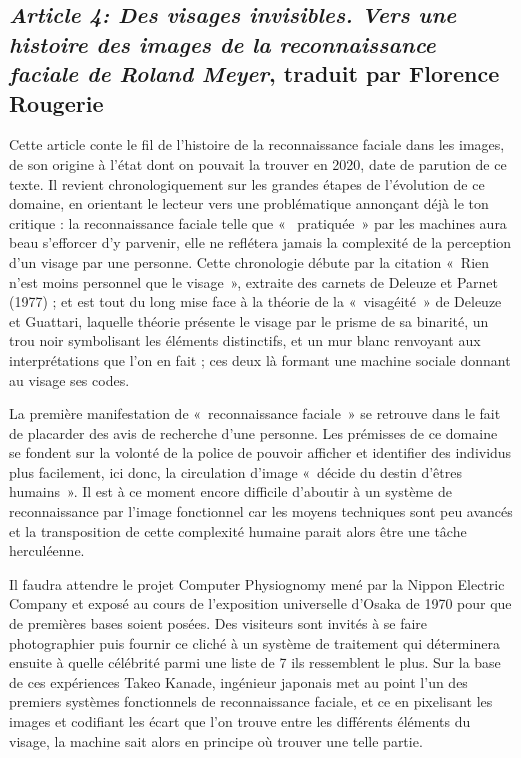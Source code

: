 \documentclass[11pt]{article}
\begin{document}
\subsection{\textit{Article 4: Des visages invisibles. Vers une histoire des images de la reconnaissance faciale de Roland 
Meyer}, traduit par Florence Rougerie}
Cette article conte le fil de l’histoire de la reconnaissance faciale dans les images, de son origine à l’état dont on pouvait 
la trouver en 2020, date de parution de ce texte. Il revient chronologiquement sur les grandes étapes de l’évolution de ce 
domaine, en orientant le lecteur vers une problématique annonçant déjà le ton critique : la reconnaissance faciale telle que « 
pratiquée » par les machines aura beau s’efforcer d’y parvenir, elle ne reflétera jamais la complexité de la perception d’un 
visage par une personne.
Cette chronologie débute par la citation « Rien n’est moins personnel que le visage », extraite des carnets de Deleuze et Parnet 
(1977) ; et est tout du long mise face à la théorie de la « visagéité » de Deleuze et Guattari, laquelle théorie présente le 
visage par le prisme de sa binarité, un trou noir symbolisant les éléments distinctifs, et un mur blanc renvoyant aux 
interprétations que l'on en fait ; ces deux là formant une machine sociale donnant au visage ses codes.

La première manifestation de « reconnaissance faciale » se retrouve dans le fait de placarder des avis de recherche d’une 
personne. Les prémisses de ce domaine se fondent sur la volonté de la police de pouvoir afficher et identifier des individus 
plus facilement, ici donc, la circulation d’image « décide du destin d’êtres humains ».
Il est à ce moment encore difficile d’aboutir à un système de reconnaissance par l’image fonctionnel car les moyens techniques 
sont peu avancés et la transposition de cette complexité humaine parait alors être une tâche herculéenne.

Il faudra attendre le projet Computer Physiognomy mené par la Nippon Electric Company et exposé au cours de l’exposition 
universelle d’Osaka de 1970 pour que de premières bases soient posées. Des visiteurs sont invités à se faire photographier puis 
fournir ce cliché à un système de traitement qui déterminera ensuite à quelle célébrité parmi une liste de 7 ils ressemblent le 
plus.
Sur la base de ces expériences Takeo Kanade, ingénieur japonais met au point l’un des premiers systèmes fonctionnels de 
reconnaissance faciale, et ce en pixelisant les images et codifiant les écart que l’on trouve entre les différents éléments du 
visage, la machine sait alors en principe où trouver une telle partie.
\end{document}
